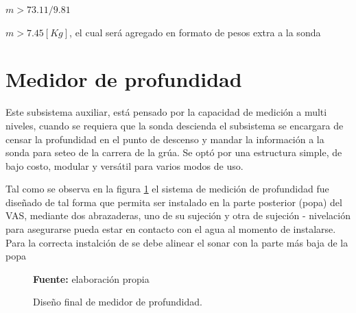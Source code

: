 $m > 73.11/9.81$

$m > 7.45 [Kg] $, el cual ser\'a agregado en formato de pesos extra a la sonda 

\section{Medidor de profundidad}
Este subsistema auxiliar, está pensado por la capacidad de medici\'on a multi niveles, cuando se requiera que la sonda descienda el subsistema se encargara de censar la profundidad en el punto de descenso y mandar la informaci\'on a la sonda para seteo de la carrera de la gr\'ua. Se opt\'o por una estructura simple, de bajo costo,  modular y vers\'atil para varios modos de uso.  

Tal como se observa en la figura \ref{fig:batimetro} el sistema de medici\'on de profundidad fue dise\~nado de tal forma que permita ser instalado en la parte posterior (popa) del VAS, mediante dos abrazaderas, uno de su sujeci\'on y otra de sujeci\'on - nivelaci\'on para asegurarse  pueda estar en contacto con el agua al momento de instalarse.  Para la correcta  instalci\'on de se debe alinear el sonar con la parte m\'as baja de la popa 

\begin{figure}[H]
\centering
{}
\caption{Dise\~no final de medidor de profundidad. }{\textbf{Fuente:} elaboración propia}
\label{fig:batimetro}
\end{figure}

